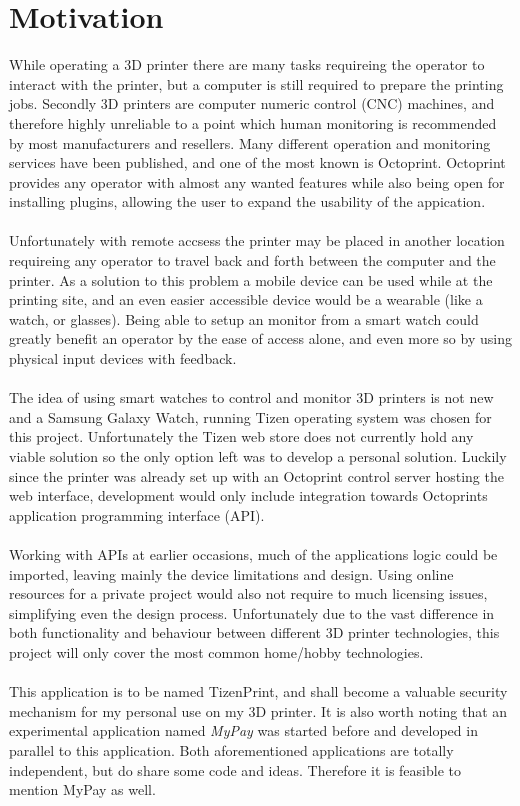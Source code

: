 \documentclass[a4paper, 12pt]{article}
\newcommand{\mysection}[1]{\section*{#1} \addcontentsline{toc}{section}{#1}}
\begin{document}
    \mysection{Motivation}
    While operating a 3D printer there are many tasks requireing the operator to interact with the printer, but a computer is
    still required to prepare the printing jobs.
    Secondly 3D printers are computer numeric control (CNC) machines, and therefore highly unreliable to a point which 
    human monitoring is recommended by most manufacturers and resellers.
    Many different operation and monitoring services have been published, and one of the most known is Octoprint.
    Octoprint provides any operator with almost any wanted features while also being open for installing plugins, allowing the user
    to expand the usability of the appication.
    \\\\
    Unfortunately with remote accsess the printer may be placed in another location requireing any operator to travel back and forth
    between the computer and the printer.
    As a solution to this problem a mobile device can be used while at the printing site, and an even easier accessible device would 
    be a wearable (like a watch, or glasses).
    Being able to setup an monitor from a smart watch could greatly benefit an operator by the ease of access alone, and even more so
    by using physical input devices with feedback.
    \\\\
    The idea of using smart watches to control and monitor 3D printers is not new and a Samsung Galaxy Watch, running Tizen operating system
    was chosen for this project.
    Unfortunately the Tizen web store does not currently hold any viable solution so the only option left was to develop a personal solution.
    Luckily since the printer was already set up with an Octoprint control server hosting the web interface, development would only
    include integration towards Octoprints application programming interface (API).
    \\\\
    Working with APIs at earlier occasions, much of the applications logic could be imported, leaving mainly the
    device limitations and design.
    Using online resources for a private project would also not require to much licensing issues, simplifying even the
    design process.
    Unfortunately due to the vast difference in both functionality and behaviour between different 3D printer
    technologies, this project will only cover the most common home/hobby technologies.
    \\\\
    This application is to be named TizenPrint, and shall become a valuable security mechanism for my personal use
    on my 3D printer.
    It is also worth noting that an experimental application named \textit{MyPay} was started before and developed
    in parallel to this application.
    Both aforementioned applications are totally independent, but do share some code and ideas.
    Therefore it is feasible to mention MyPay as well.
\end{document}
